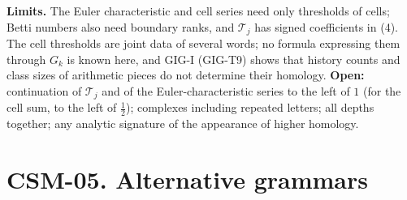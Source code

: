 \documentclass[
  11pt,
]{article}
\begin{document}
\textbf{Limits.} The Euler characteristic and cell series need only
thresholds of cells; Betti numbers also need boundary ranks, and
\(\mathcal T_j\) has signed coefficients in (4). The cell thresholds are
joint data of several words; no formula expressing them through \(G_k\)
is known here, and GIG-I (GIG-T9) shows that history counts and class
sizes of arithmetic pieces do not determine their homology.
\textbf{Open:} continuation of \(\mathcal T_j\) and of the
Euler-characteristic series to the left of \(1\) (for the cell sum, to
the left of \(\frac12\)); complexes including repeated letters; all
depths together; any analytic signature of the appearance of higher
homology.

\hypertarget{csm-05.-alternative-grammars}{%
\section{CSM-05. Alternative
grammars}\label{csm-05.-alternative-grammars}}
\end{document}
